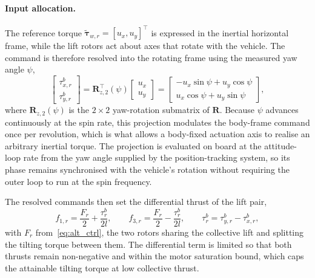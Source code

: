 \paragraph{Input allocation.}
The reference torque $\tilde{\boldsymbol{\tau}}_{w,r} = [u_x, u_y]^{\top}$ is
expressed in the inertial horizontal frame, while the lift rotors act about
axes that rotate with the vehicle.  The command is therefore resolved into the
rotating frame using the measured yaw angle $\psi$,
\begin{equation}
    \begin{bmatrix}\tau^b_{x,r}\\[2pt]\tau^b_{y,r}\end{bmatrix}
        = \boldsymbol{R}_{z,2}^{\top}(\psi)
          \begin{bmatrix}u_x\\[2pt]u_y\end{bmatrix}
        = \begin{bmatrix}
            -u_x\sin\psi + u_y\cos\psi \\[2pt]
             u_x\cos\psi + u_y\sin\psi
          \end{bmatrix},
    \label{eq:torque_projection}
\end{equation}
where $\boldsymbol{R}_{z,2}(\psi)$ is the $2\times2$ yaw-rotation submatrix of
$\boldsymbol{R}$.  Because $\psi$ advances continuously at the spin rate, this
projection modulates the body-frame command once per revolution, which is what
allows a body-fixed actuation axis to realise an arbitrary inertial torque.
The projection is evaluated on board at the attitude-loop rate from the yaw
angle supplied by the position-tracking system, so its phase remains
synchronised with the vehicle's rotation without requiring the outer loop to
run at the spin frequency.

The resolved commands then set the differential thrust of the lift pair,
\begin{equation}
    f_{1,r} = \frac{F_r}{2} + \frac{\tau^b_r}{2l},
    \qquad
    f_{3,r} = \frac{F_r}{2} - \frac{\tau^b_r}{2l},
    \qquad
    \tau^b_r = \tau^b_{y,r} - \tau^b_{x,r},
    \label{eq:alloc}
\end{equation}
with $F_r$ from~\eqref{eq:alt_ctrl}, the two rotors sharing the collective
lift and splitting the tilting torque between them.  The differential term is
limited so that both thrusts remain non-negative and within the motor
saturation bound, which caps the attainable tilting torque at low collective
thrust.

